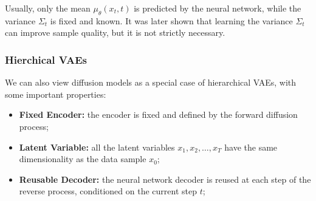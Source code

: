 Usually, only the mean $\mu_\theta(x_t, t)$ is predicted by the neural network, while the variance $\Sigma_t$ is fixed and known. 
It was later shown that learning the variance $\Sigma_t$ can improve sample quality, but it is not strictly necessary.

\subsubsection{Hierchical VAEs}
We can also view diffusion models as a special case of hierarchical VAEs, with some important properties:
\begin{itemize}
    \item \textbf{Fixed Encoder:} the encoder is fixed and defined by the forward diffusion process;
    \item \textbf{Latent Variable:} all the latent variables $x_1, x_2, \ldots, x_T$ have the same dimensionality as the data sample $x_0$;
    \item \textbf{Reusable Decoder:} the neural network decoder is reused at each step of the reverse process, conditioned on the current step $t$;
\end{itemize}

